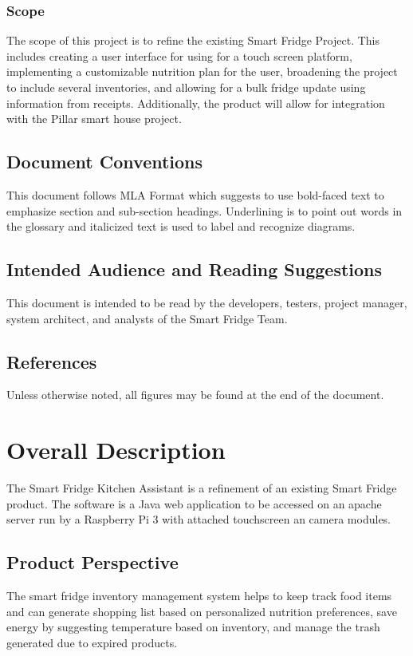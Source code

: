 \subsubsection{Scope} The scope of this project is to refine the existing Smart Fridge Project. This includes creating a user interface for using for a touch screen platform, implementing a customizable nutrition plan for the user, broadening the project to include several inventories, and allowing for a bulk fridge update using information from receipts. Additionally, the product will allow for integration with the Pillar smart house project.


\subsection{Document Conventions}
This document follows MLA Format which suggests to use bold-faced text to emphasize section and sub-section headings. Underlining is to point out words in the glossary and italicized text is
used to label and recognize diagrams.

\subsection{Intended Audience and Reading Suggestions}
This document is intended to be read by the developers, testers, project manager, system architect, and analysts of the Smart Fridge Team. 

\subsection{References}
Unless otherwise noted, all figures may be found at the end of the document.

\section{Overall Description}
The Smart Fridge Kitchen Assistant is a refinement of an existing Smart Fridge product. The software is a Java web application to be accessed on an apache server run by a Raspberry Pi 3 with attached touchscreen an camera  modules. 

\subsection{Product Perspective} The smart fridge inventory management system helps to keep track food items and can generate shopping list based on personalized nutrition preferences, save energy by suggesting temperature based on inventory, and manage the trash generated due to expired products.

